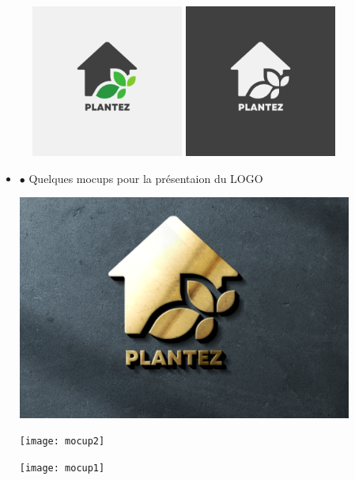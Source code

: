 \documentclass[a4paper,12pt,oneside]{article}
\begin{document}
{\begin{figure}[h]
  \begin{minipage}{0.48\textwidth}
    \centering
    \includegraphics[width=5cm]{2}
    
    
  \end{minipage}
  \hfill
  \begin{minipage}{0.48\textwidth}
    \centering
    \includegraphics[width=5cm]{3.png}
    
    
  \end{minipage}
\end{figure}
		
\vskip1mm
\newpage
		\begin{itemize}
		\item[] $\bullet$ Quelques mocups pour la présentaion du 				LOGO
		\begin{center}
  		\includegraphics[width=11cm]{mocup3}
		\end{center}
		\begin{center}
  		\texttt{[image: mocup2]}
		\end{center}
		\begin{center}
  		\texttt{[image: mocup1]}
		\end{center}
		\end{itemize}
		
}
\end{document}
